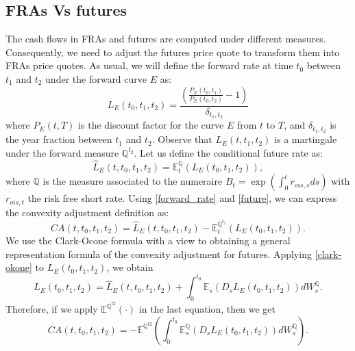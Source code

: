 \documentclass[a4paper,10pt]{article}
\newcommand{\1}{\mathbf{1}}
\begin{document}
\subsection{FRAs Vs futures}
The cash flows in FRAs and futures are computed under different measures. Consequently, we need to adjust the futures price quote to transform them into FRAs price quotes. As usual, we will define the forward rate at time $t_0$ between $t_1$ and $t_2$ under the forward curve $E$ as:
\begin{equation}\label{forward_rate}
L_{E}(t_0, t_1, t_2) = \frac{\left(\frac{P_{E}(t_0,t_1)}{P_{E}(t_0,t_2)} - 1 \right)}{\delta_{t_1,t_2}}
\end{equation} 
where $P_{E}(t,T)$ is the discount factor for the curve $E$ from $t$ to $T$, and $\delta_{t_1,t_2}$ is the year fraction between $t_1$ and $t_2$. Observe that $L_{E}(t, t_1, t_2)$ is a martingale under the forward measure $\mathbb{Q}^{t_2}$. Let us define the conditional future rate as:  
\begin{equation}\label{future}
\hat{L}_{E}(t,t_0, t_1, t_2) = \mathbb{E}_t^{\mathbb{Q}}\left(L_{E}(t_0, t_1, t_2) \right), 
\end{equation}
where $\mathbb{Q}$ is the measure associated to the numeraire $B_t=\exp\left(\int_{0}^{t} r_{ois, s} ds \right)$ with $ r_{ois, t}$ the risk free short rate. Using
\eqref{forward_rate} and \eqref{future}, we can express the convexity adjustment definition as:%
\begin{equation*}
CA(t, t_0, t_1, t_2) = \hat{L}_{E}(t,t_0, t_1, t_2) - \mathbb{E}_t^{\mathbb{Q}^{t_2}}\left(L_{E}(t_0, t_1, t_2) \right).
\end{equation*}
We use the Clark-Ocone formula with a view to obtaining a general representation formula of the convexity adjustment for futures. Applying \eqref{clark-okone} to 
$L_{E}(t_0,t_1,t_2)$, we obtain
\begin{equation}
L_{E}(t_0,t_1,t_2) = \hat{L}_{E}(t,t_0, t_1, t_2) + \int_{0}^{t_0} \mathbb{E}_{s}\left(D_s L_{E}(t_0,t_1,t_2) \right) dW^{\mathbb{Q}}_s.
\end{equation} 
Therefore, if we apply $\mathbb{E}^{\mathbb{Q}^{t2}}(\cdot)$ in the last equation, then we get
\begin{equation*}
CA(t, t_0, t_1, t_2) = - \mathbb{E}^{\mathbb{Q}^{t2}}\left(\int_{0}^{t_0} \mathbb{E}^{\mathbb{Q}}_{s}\left(D_s L_{E}(t_0,t_1,t_2) \right) dW^{\mathbb{Q}}_s \right).
\end{equation*}
\end{document}
